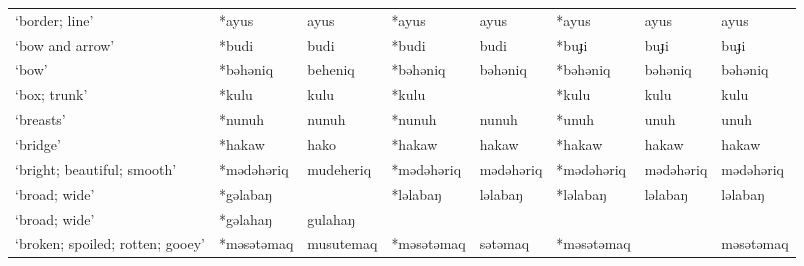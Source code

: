 \begin{landscape}
\begin{longtable}[c]{@{}p{3cm}<{\raggedright}p{2.75cm}<{\raggedright}p{2.75cm}<{\raggedright}p{2.75cm}<{\raggedright}p{2.75cm}<{\raggedright}p{2.75cm}<{\raggedright}p{2.75cm}<{\raggedright}p{2.75cm}<{\raggedright}@{}}
`border; line'                                       & *ayus        & ayus                          & *ayus          & ayus                       & *ayus            & ayus                     & ayus                              \\
`bow and arrow'                                      & *budi        & budi                          & *budi          & budi                       & *buɟi            & buɟi                     & buɟi                              \\
`bow'                                                & *bəhəniq     & beheniq                       & *bəhəniq       & bəhəniq                    & *bəhəniq         & bəhəniq                  & bəhəniq                           \\
`box; trunk'                                         & *kulu        & kulu                          & *kulu          &                            & *kulu            & kulu                     & kulu                              \\
`breasts'                                            & *nunuh       & nunuh                         & *nunuh         & nunuh                      & *unuh            & unuh                     & unuh                              \\
`bridge'                                             & *hakaw       & hako                          & *hakaw         & hakaw                      & *hakaw           & hakaw                    & hakaw                             \\
`bright; beautiful; smooth'                          & *mədəhəriq   & mudeheriq                     & *mədəhəriq     & mədəhəriq                  & *mədəhəriq       & mədəhəriq                & mədəhəriq                         \\
`broad; wide'                                        & *gəlabaŋ     &                               & *ləlabaŋ       & ləlabaŋ                    & *ləlabaŋ         & ləlabaŋ                  & ləlabaŋ                           \\
`broad; wide'                                        & *gəlahaŋ     & gulahaŋ                       &                &                            &                  &                          &                                   \\
`broken; spoiled; rotten; gooey'                     & *məsətəmaq   & musutemaq                     & *məsətəmaq     & sətəmaq                    & *məsətəmaq       &                          & məsətəmaq                         \\

\end{longtable}
\end{landscape}
